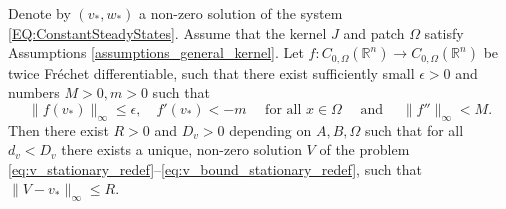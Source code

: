 \documentclass[review,onefignum,onetabnum]{SIAM-styles/siamart171218}
\begin{document}
\begin{thm}
    \label{thm:Stationary-Solutions-Existence}
    Denote by $(v_*, w_*)$ a non-zero solution of the system \eqref{EQ:ConstantSteadyStates}. Assume that the kernel $J$ and patch $\Omega$ satisfy Assumptions \ref{assumptions_general_kernel}. Let $f : C_{0, \Omega}(\mathbb{R}^n) \rightarrow C_{0, \Omega}(\mathbb{R}^n)$ be twice Fr\'echet differentiable, such that there exist sufficiently small $\epsilon > 0$ and numbers $M > 0, m > 0$ such that
    \begin{equation}
        \|f(v_*)\|_\infty \leq \epsilon, 
        \quad
        f'(v_*) < -m
        \quad
        \text{ for all }
        x \in \Omega
        \quad
        \text{ and }
        \quad
        \|f''\|_\infty < M.
    \end{equation}
    Then there exist $R > 0$ and $D_v > 0$ depending on $A, B, \Omega$ such that for all $d_v < D_v$ there exists a unique, non-zero solution $V$ of the problem \eqref{eq:v_stationary_redef}--\eqref{eq:v_bound_stationary_redef}, such that $\|V-v_*\|_\infty \leq R$.
\end{thm}
\end{document}
